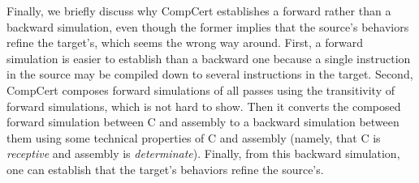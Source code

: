 Finally, we briefly discuss why CompCert establishes a forward
rather than a backward simulation, even though the former implies that
the source's behaviors refine the target's, which seems the wrong way
around.  First, a forward simulation is easier to establish than a
backward one because a single instruction in the source may be
compiled down to several instructions in the target. Second, CompCert
composes forward simulations of all passes using the transitivity of
forward simulations, which is not hard to show. Then it converts the
composed forward simulation between C and assembly to a backward
simulation between them using some technical properties of C and
assembly (namely, that C is \emph{receptive} and assembly is
\emph{determinate}). Finally, from this backward simulation, one can
establish that the target's behaviors refine the source's.



%

